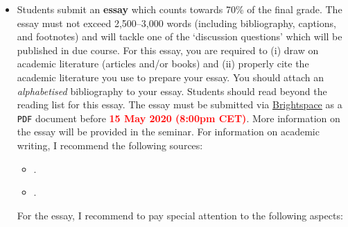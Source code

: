\documentclass[abstract=on,parskip=full,headings=standardclasses,fontsize=11pt,paper=a4]{scrartcl}
\begin{document}
\begin{itemize}
\item Students submit an \textbf{essay}  which counts towards 70\% of the final grade. The essay must not exceed 2,500--3,000 words  (including bibliography, captions, and footnotes) and  will tackle one of the `discussion questions' which will be published in due course. For this essay, you are required to (i) draw on academic literature (articles and/or books) and (ii) properly cite the academic literature you use to prepare your essay. You should attach an \textit{alphabetised}  bibliography to your essay. Students should read beyond the reading list for this essay. The essay must be submitted via \href{https://brightspace.ucd.ie/d2l/home}{Brightspace} as a \texttt{PDF} document before \textbf{\textcolor{red}{15 May 2020 (8:00pm CET)}}. More information on the essay will be provided in the seminar. For information on academic writing, I recommend the following sources:

\begin{itemize}
\item {}.
\item {}.
\end{itemize}

For the essay, I recommend to pay special attention to the following aspects:


\end{itemize}
\end{document}
